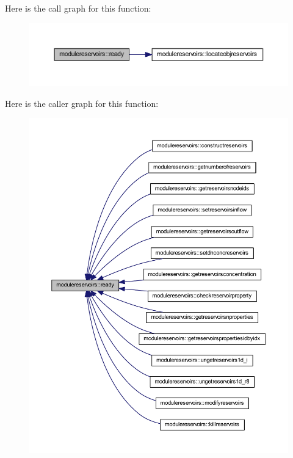 Here is the call graph for this function\+:\nopagebreak
\begin{figure}[H]
\begin{center}
\leavevmode
\includegraphics[width=350pt]{namespacemodulereservoirs_a5aff53aba3466a0410c29761e37a55a5_cgraph}
\end{center}
\end{figure}
Here is the caller graph for this function\+:\nopagebreak
\begin{figure}[H]
\begin{center}
\leavevmode
\includegraphics[width=350pt]{namespacemodulereservoirs_a5aff53aba3466a0410c29761e37a55a5_icgraph}
\end{center}
\end{figure}
\mbox{\label{namespacemodulereservoirs_ae21cb91c7b00a7c56ed8f0d763dd75a2}} 
